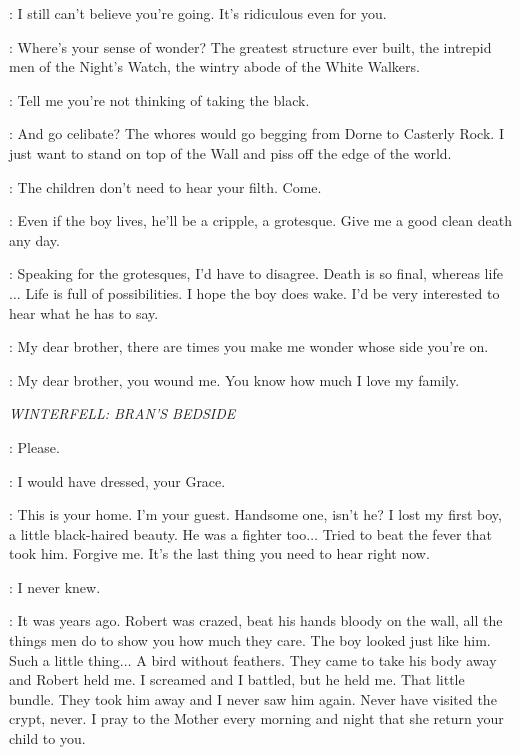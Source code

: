 \CERSEI: I still can't believe you're going. It's ridiculous even for you. 

\TYRION: Where's your sense of wonder? The greatest structure ever built, the intrepid men of the Night's Watch, the wintry abode of the White Walkers. 

\JAIME: Tell me you're not thinking of taking the black. 

\TYRION: And go celibate? The whores would go begging from Dorne to Casterly Rock. I just want to stand on top of the Wall and piss off the edge of the world. 

\CERSEI: The children don't need to hear your filth. Come.  

\JAIME: Even if the boy lives, he'll be a cripple, a grotesque. Give me a good clean death any day. 

\TYRION: Speaking for the grotesques, I'd have to disagree. Death is so final, whereas life$\ldots$ Life is full of possibilities. I hope the boy does wake. I'd be very interested to hear what he has to say. 

\JAIME: My dear brother, there are times you make me wonder whose side you're on. 

\TYRION: My dear brother, you wound me. You know how much I love my family. 

\scene

\textit{WINTERFELL: BRAN'S BEDSIDE}


\CERSEI: Please. 

\CATELYN: I would have dressed, your Grace. 

\CERSEI: This is your home. I'm your guest. Handsome one, isn't he? I lost my first boy, a little black-haired beauty. He was a fighter too$\ldots$ Tried to beat the fever that took him. Forgive me. It's the last thing you need to hear right now. 

\CATELYN: I never knew. 

\CERSEI: It was years ago. Robert was crazed, beat his hands bloody on the wall, all the things men do to show you how much they care. The boy looked just like him. Such a little thing$\ldots$ A bird without feathers. They came to take his body away and Robert held me. I screamed and I battled, but he held me. That little bundle. They took him away and I never saw him again. Never have visited the crypt, never. I pray to the Mother every morning and night that she return your child to you. 

